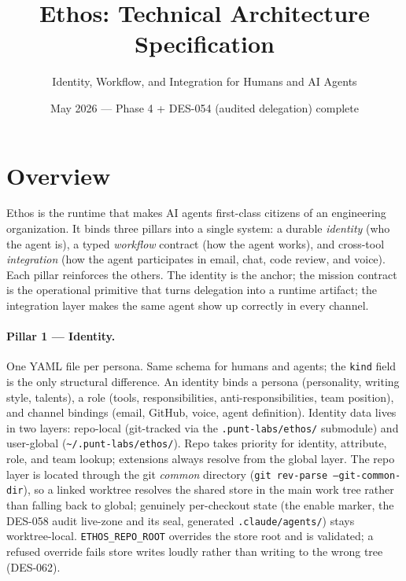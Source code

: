 \documentclass[a4paper,10pt]{article}
\newcommand{\field}[1]{\texttt{#1}}
\newcommand{\cmd}[1]{\texttt{#1}}
\newcommand{\fpath}[1]{\texttt{#1}}
\begin{document}
\title{Ethos: Technical Architecture Specification}
\author{Identity, Workflow, and Integration for Humans and AI Agents}
\date{May 2026 --- Phase 4 + DES-054 (audited delegation) complete}
\maketitle

\tableofcontents
\newpage

\section{Overview}

Ethos is the runtime that makes AI agents first-class citizens of an
engineering organization.  It binds three pillars into a single
system: a durable \emph{identity} (who the agent is), a typed
\emph{workflow} contract (how the agent works), and cross-tool
\emph{integration} (how the agent participates in email, chat, code
review, and voice).  Each pillar reinforces the others.  The identity
is the anchor; the mission contract is the operational primitive
that turns delegation into a runtime artifact; the integration layer
makes the same agent show up correctly in every channel.

\paragraph{Pillar 1 --- Identity.} One YAML file per persona.  Same
schema for humans and agents; the \field{kind} field is the only
structural difference.  An identity binds a persona (personality,
writing style, talents), a role (tools, responsibilities,
anti-responsibilities, team position), and channel bindings (email,
GitHub, voice, agent definition).  Identity data lives in two
layers: repo-local (git-tracked via the \fpath{.punt-labs/ethos/}
submodule) and user-global (\fpath{\~{}/.punt-labs/ethos/}).  Repo
takes priority for identity, attribute, role, and team lookup;
extensions always resolve from the global layer.  The repo layer is
located through the git \emph{common} directory
(\cmd{git rev-parse --git-common-dir}), so a linked worktree resolves
the shared store in the main work tree rather than falling back to
global; genuinely per-checkout state (the enable marker, the DES-058
audit live-zone and its seal, generated \fpath{.claude/agents/}) stays
worktree-local.  \cmd{ETHOS\_REPO\_ROOT} overrides the store root
and is validated; a refused override fails store writes loudly rather
than writing to the wrong tree (DES-062).
\end{document}
